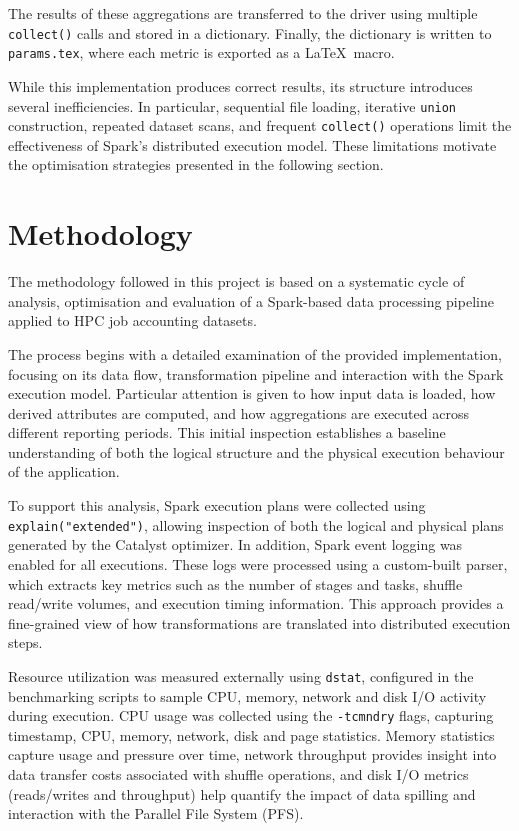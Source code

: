 \documentclass[conference,a4paper]{IEEEtran}
\begin{document}
The results of these aggregations are transferred to the driver using multiple
\texttt{collect()} calls and stored in a dictionary. Finally, the dictionary is
written to \texttt{params.tex}, where each metric is exported as a \LaTeX\ macro.

While this implementation produces correct results, its structure introduces
several inefficiencies. In particular, sequential file loading, iterative
\texttt{union} construction, repeated dataset scans, and frequent
\texttt{collect()} operations limit the effectiveness of Spark’s distributed
execution model. These limitations motivate the optimisation strategies
presented in the following section.

\section{Methodology}
\label{sec:methodology}

The methodology followed in this project is based on a systematic cycle of
analysis, optimisation and evaluation of a Spark-based data processing pipeline
applied to HPC job accounting datasets.

The process begins with a detailed examination of the provided implementation,
focusing on its data flow, transformation pipeline and interaction with the
Spark execution model. Particular attention is given to how input data is
loaded, how derived attributes are computed, and how aggregations are executed
across different reporting periods. This initial inspection establishes a
baseline understanding of both the logical structure and the physical execution
behaviour of the application.

To support this analysis, Spark execution plans were collected using
\texttt{explain("extended")}, allowing inspection of both the logical and
physical plans generated by the Catalyst optimizer. In addition, Spark event
logging was enabled for all executions. These logs were processed using a
custom-built parser, which extracts key metrics such as the number of stages and
tasks, shuffle read/write volumes, and execution timing information. This
approach provides a fine-grained view of how transformations are translated into
distributed execution steps.

Resource utilization was measured externally using \texttt{dstat}, configured in
the benchmarking scripts to sample CPU, memory, network and disk I/O activity
during execution. CPU usage was collected using the \texttt{-tcmndry} flags,
capturing timestamp, CPU, memory, network, disk and page statistics. Memory
statistics capture usage and pressure over time, network throughput provides
insight into data transfer costs associated with shuffle operations, and disk
I/O metrics (reads/writes and throughput) help quantify the impact of data
spilling and interaction with the Parallel File System (PFS).
\end{document}
